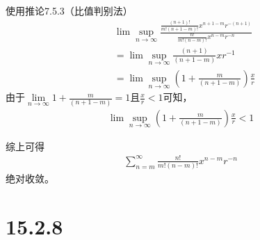 \documentclass{article}
\begin{document}
使用推论7.5.3（比值判别法）
\begin{align*}
   & \lim\sup\limits_{n \to \infty} \frac{\frac{(n + 1)!}{m!(n + 1 - m)!}x^{n+1-m}r^{-(n+1)}}{\frac{n!}{m!(n - m)!}x^{n - m}r^{-n}} \\
   & = \lim\sup\limits_{n \to \infty} \frac{(n + 1)}{(n + 1 - m)} xr^{-1}                                                           \\
   & =  \lim\sup\limits_{n \to \infty} (1 + \frac{m}{(n + 1 - m)}) \frac{x}{r}
\end{align*}
由于$\lim\limits_{n \to \infty} 1 + \frac{m}{(n + 1 - m)} = 1$且$\frac{x}{r} < 1$可知，
\begin{align*}
  \lim\sup\limits_{n \to \infty} (1 + \frac{m}{(n + 1 - m)}) \frac{x}{r} < 1
\end{align*}

综上可得
\begin{align*}
  \sum\limits_{n = m}^{\infty} \frac{n!}{m!(n - m)!}x^{n - m}r^{-n}
\end{align*}
绝对收敛。


\section*{15.2.8}
\end{document}
